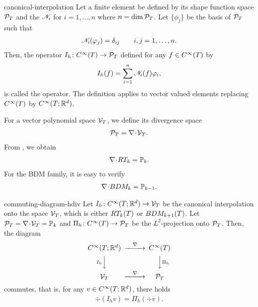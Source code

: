 \begin{Definition}{canonical-interpolation}
  Let a finite element be defined by its shape function space
  $\mathcal P_\cell$ and the  $\nodal_i$
  for $i=1,\dots,n$ where $n=\dim\mathcal P_\cell$. Let $\{\phi_j\}$
  be the basis of $\mathcal P_\cell$ such that
  \begin{gather}
    \nodal_i(\phi_j) = \delta_{ij}
    \qquad i,j=1,\dots,n.
  \end{gather}
  Then, the operator $I_h\colon C^\infty(\cell)\to \mathcal P_\cell$
  defined for any $f\in C^\infty(\cell)$ by
  \begin{gather}
    I_h(f) = \sum_{i=1}^n \nodal_i(f) \phi_i,
  \end{gather}
  is called the  operator. The
  definition applies to vector valued elements replacing
  $C^\infty(\cell)$ by $C^\infty(\cell;\R^d)$.
\end{Definition}

\begin{remark}
  For a vector polynomial space $\mathcal V_\cell$, we define its
  divergence space
  \begin{gather}
    \mathcal P_\cell = \div \mathcal V_\cell.
  \end{gather}
  From , we obtain
  \begin{gather}
    \label{eq:darcy:37}
    \div RT_k = \P_k.
  \end{gather}
  For the BDM family, it is easy to verify
  \begin{gather}
    \div BDM_k = \P_{k-1}.
  \end{gather}
\end{remark}

\begin{Lemma}{commuting-diagram-hdiv}
  Let $I_h\colon C^\infty(\cell;\R^d)\to \mathcal V_\cell$ be the
  canonical interpolation onto the space $\mathcal V_\cell$, which is
  either $RT_k(\cell)$ or $BDM_{k+1}(\cell)$. Let $\mathcal P_\cell = \div
  \mathcal V_\cell = \P_k$ and $\Pi_h\colon C^\infty(\cell)\to \mathcal
  P_\cell$ be the $L^2$-projection onto $\mathcal P_\cell$. Then, the
  diagram
  \begin{gather}
    \label{eq:darcy:35}
    \begin{CD}
      C^\infty(\cell;\R^d) @>\div>> C^\infty(\cell) \\
      @V{I_h}VV @VV{\Pi_h}V\\
      \mathcal V_\cell @>\div>> \mathcal P_\cell
    \end{CD}
  \end{gather}
  commutes, that is, for any $v\in C^\infty(\cell;\R^d)$, there holds
  \begin{gather}
    \label{eq:darcy:36}
    \div (I_h v) = \Pi_h(\div v).
  \end{gather}
\end{Lemma}

